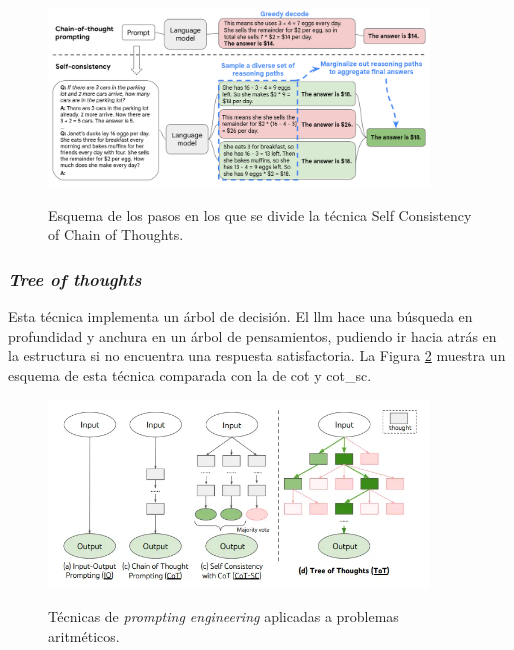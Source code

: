 \begin{figure}[H]
    \caption{Esquema de los pasos en los que se divide la técnica {Self Consistency of Chain of Thoughts}.}
    \centering
    \includegraphics[width=0.9\textwidth]{./figuras/cot_sc.png}
    \label{fig:cot_sc}
\end{figure}

\subsubsection{\emph{Tree of thoughts}}

Esta técnica implementa un árbol de decisión. El \gls{llm} hace una búsqueda en profundidad y anchura en un árbol de pensamientos, pudiendo ir hacia atrás en la estructura si no encuentra una respuesta satisfactoria. La Figura \ref{fig:prompting_engineering} muestra un esquema de esta técnica comparada con la de \gls{cot} y \gls{cot_sc}.

\begin{figure}[H]
  \caption[Técnicas de \emph{prompting engineering}]{Técnicas de \emph{prompting engineering} aplicadas a problemas aritméticos.}
  \centering
  \includegraphics[width=0.9\textwidth]{./figuras/prompt_engineering_techniques.png}
  \label{fig:prompting_engineering}
\end{figure}


